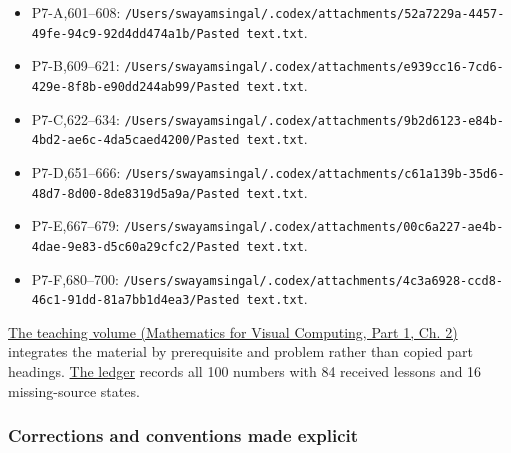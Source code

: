 \begin{itemize}
\tightlist
\item
  P7-A,601--608: \texttt{/Users/swayamsingal/.codex/attachments/52a7229a-4457-49fe-94c9-92d4dd474a1b/Pasted\ text.txt}.
\item
  P7-B,609--621: \texttt{/Users/swayamsingal/.codex/attachments/e939cc16-7cd6-429e-8f8b-e90dd244ab99/Pasted\ text.txt}.
\item
  P7-C,622--634: \texttt{/Users/swayamsingal/.codex/attachments/9b2d6123-e84b-4bd2-ae6c-4da5caed4200/Pasted\ text.txt}.
\item
  P7-D,651--666: \texttt{/Users/swayamsingal/.codex/attachments/c61a139b-35d6-48d7-8d00-8de8319d5a9a/Pasted\ text.txt}.
\item
  P7-E,667--679: \texttt{/Users/swayamsingal/.codex/attachments/00c6a227-ae4b-4dae-9e83-d5c60a29cfc2/Pasted\ text.txt}.
\item
  P7-F,680--700: \texttt{/Users/swayamsingal/.codex/attachments/4c3a6928-ccd8-46c1-91dd-81a7bb1d4ea3/Pasted\ text.txt}.
\end{itemize}

\href{../02-Mathematics-for-Visual-Computing-P01/main.pdf\#nameddest=01-foundations-i-ch018-keep-the-promises-visible-while-moving-between-representations}{The teaching volume (Mathematics for Visual Computing, Part 1, Ch. 2)} integrates the material by prerequisite and problem rather than copied part headings. \hyperref[appendix-fd090d982a15-phase-7---parts-601-700]{The ledger} records all 100 numbers with 84 received lessons and 16 missing-source states.

\subsubsection{Corrections and conventions made explicit}\label{appendix-a103e7846d21-corrections-and-conventions-made-explicit}

\hypertarget{appendix-a103e7846d21-corrections-and-conventions-made-explicit}{}

